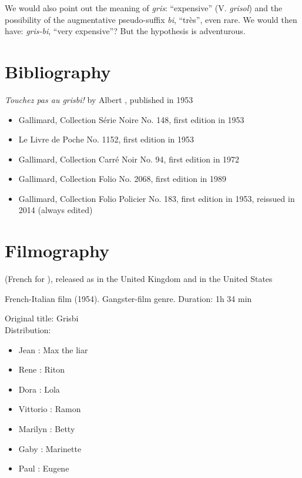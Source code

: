 
We would also point out the meaning of \emph{gris}: ``expensive'' (V. \emph{grisol}) and the possibility of the augmentative pseudo-suffix \emph{bi}, ``très'', even rare. We would then have: \emph{gris-bi}, ``very expensive''? But the hypothesis is adventurous.


\section{Bibliography\label{preamble-biblio}}

\emph{Touchez pas au grisbi!} by Albert , published in 1953

\begin{itemize}%
	\item Gallimard, Collection Série Noire No. 148, first edition in 1953
	\item Le Livre de Poche No. 1152, first edition in 1953
	\item Gallimard, Collection Carré Noir No. 94, first edition in 1972
	\item Gallimard, Collection Folio No. 2068, first edition in 1989
	\item Gallimard, Collection Folio Policier No. 183, first edition in 1953, reissued in 2014 (always edited)
\end{itemize}

\section{Filmography\label{preamble-filmography}}

 (French for ), released as  in the United Kingdom and  in the United States

French-Italian film (1954). Gangster-film genre. Duration: 1h 34 min

Original title: Grisbi\\

Distribution:

\begin{itemize}%
    \item Jean : Max the liar
    \item Rene : Riton
    \item Dora : Lola
    \item Vittorio : Ramon
    \item Marilyn : Betty
    \item Gaby : Marinette
    \item Paul : Eugene
\end{itemize}

